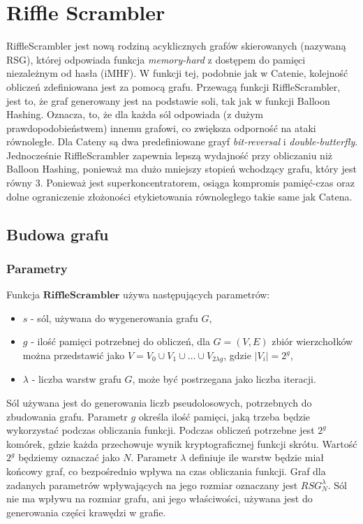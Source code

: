 \chapter{Riffle Scrambler}
\thispagestyle{chapterBeginStyle}
\label{razdzial2}

RiffleScrambler \cite{rs} jest nową rodziną acyklicznych grafów skierowanych (nazywaną RSG), której odpowiada funkcja \textit{memory-hard} z dostępem do pamięci niezależnym od hasła (iMHF).
W funkcji tej, podobnie jak w Catenie, kolejność obliczeń zdefiniowana jest za pomocą grafu. 
Przewagą funkcji RiffleScrambler, jest to, że graf generowany jest na podstawie soli, tak jak w funkcji Balloon Hashing. Oznacza, to, że dla każda sól odpowiada (z dużym prawdopodobieństwem) innemu grafowi, co zwiększa odporność na ataki równoległe. Dla Cateny są dwa predefiniowane grayf \textit{bit-reversal} i \textit{double-butterfly}.
Jednocześnie RiffleScrambler zapewnia lepszą wydajność przy obliczaniu niż Balloon Hashing, ponieważ ma dużo mniejszy stopień wchodzący grafu, który jest równy 3.
Ponieważ jest superkoncentratorem, osiąga kompromis pamięć-czas oraz dolne ograniczenie złożoności etykietowania równoległego takie same jak Catena.

\section{Budowa grafu}

\subsection{Parametry} \label{2::params}
Funkcja $\mathbf{RiffleScrambler}$ używa następujących parametrów:
\begin{itemize}
	\item $s$ - sól, używana do wygenerowania grafu $G$,
	
	\item $g$ - \label{rs::g} ilość pamięci potrzebnej do obliczeń, dla $G = (V, E)$ zbiór wierzchołków można przedstawić jako $V = V_{0} \cup V_{1} \cup \dots \cup V_{2 \lambda g}$, gdzie $|V_{i}| = 2^{g}$,
	
	\item $\lambda$ - liczba warstw grafu $G$, może być postrzegana jako liczba iteracji.
\end{itemize}

Sól używana jest do generowania liczb pseudolosowych, potrzebnych do zbudowania grafu.
Parametr $g$ określa ilość pamięci, jaką trzeba będzie wykorzystać podczas obliczania funkcji. Podczas obliczeń potrzebne jest $2^{g}$ komórek, gdzie każda przechowuje wynik kryptograficznej funkcji skrótu. Wartość $2^g$ będziemy oznaczać jako $N$.
Parametr $\lambda$ definiuje ile warstw będzie miał końcowy graf, co bezpośrednio wpływa na czas obliczania funkcji.
Graf dla zadanych parametrów wpływających na jego rozmiar oznaczany jest $RSG_{N}^{\lambda}$. Sól nie ma wpływu na rozmiar grafu, ani jego właściwości, używana jest do generowania części krawędzi w grafie.


